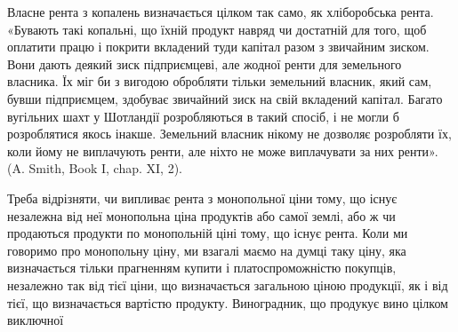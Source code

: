 Власне рента з копалень визначається цілком так само, як хліборобська
рента. «Бувають такі копальні, що їхній продукт навряд чи достатній для того,
щоб оплатити працю і покрити вкладений туди капітал разом з звичайним
зиском. Вони дають деякий зиск підприємцеві, але жодної ренти для земельного
власника. Їх міг би з вигодою обробляти тільки земельний власник, який сам,
бувши підприємцем, здобуває звичайний зиск на свій вкладений капітал. Багато
вугільних шахт у Шотландії розробляються в такий спосіб, і не могли б
розроблятися якось інакше. Земельний власник нікому не дозволяє розробляти
їх, коли йому не виплачують ренти, але ніхто не може виплачувати за них
ренти». (A. Smith, Book I, chap. XI, 2).

Треба відрізняти, чи випливає рента з монопольної ціни тому, що існує
незалежна від неї монопольна ціна продуктів або самої землі, або ж чи продаються
продукти по монопольній ціні тому, що існує рента. Коли ми говоримо
про монопольну ціну, ми взагалі маємо на думці таку ціну, яка визначається
тільки прагненням купити і платоспроможністю покупців, незалежно так від
тієї ціни, що визначається загальною ціною продукції, як і від тієї, що визначається
вартістю продукту. Виноградник, що продукує вино цілком виключної